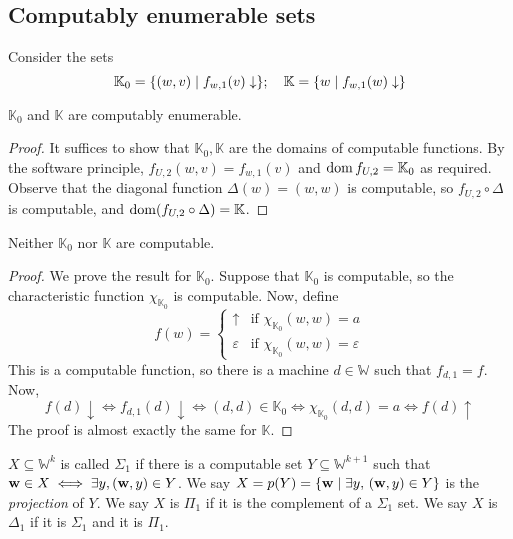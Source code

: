\subsection{Computably enumerable sets}
Consider the sets
\[ \mathbb K_0 = \qty{(w, v) \mid f_{w,1}(v) \downarrow};\quad \mathbb K = \qty{w \mid f_{w,1}(w) \downarrow} \]
\begin{theorem}
	\( \mathbb K_0 \) and \( \mathbb K \) are computably enumerable.
\end{theorem}
\begin{proof}
	It suffices to show that \( \mathbb K_0, \mathbb K \) are the domains of computable functions.
	By the software principle, \( f_{U,2}(w,v) = f_{w,1}(v) \) and \( \operatorname{dom} f_{U,2} = \mathbb K_0 \) as required.
	Observe that the diagonal function \( \Delta(w) = (w, w) \) is computable, so \( f_{U,2} \circ \Delta \) is computable, and \( \operatorname{dom}(f_{U,2} \circ \Delta) = \mathbb K \).
\end{proof}
\begin{theorem}
	Neither \( \mathbb K_0 \) nor \( \mathbb K \) are computable.
\end{theorem}
\begin{proof}
	We prove the result for \( \mathbb K_0 \).
	Suppose that \( \mathbb K_0 \) is computable, so the characteristic function \( \chi_{\mathbb K_0} \) is computable.
	Now, define
	\[ f(w) = \begin{cases}
		\uparrow & \text{if } \chi_{\mathbb K_0}(w,w) = a \\
		\varepsilon & \text{if } \chi_{\mathbb K_0}(w,w) = \varepsilon
	\end{cases} \]
	This is a computable function, so there is a machine \( d \in \mathbb W \) such that \( f_{d,1} = f \).
	Now,
	\[ f(d) \downarrow \iff f_{d,1}(d) \downarrow \iff (d,d) \in \mathbb K_0 \iff \chi_{\mathbb K_0}(d,d) = a \iff f(d) \uparrow \]
	The proof is almost exactly the same for \( \mathbb K \).
\end{proof}
\begin{definition}
	\( X \subseteq \mathbb W^k \) is called \( \Sigma_1 \) if there is a computable set \( Y \subseteq \mathbb W^{k+1} \) such that \( \vb w \in X \iff \exists y, (\vb w, y) \in Y \).
	We say \( X = p(Y) = \qty{\vb w \mid \exists y,\, (\vb w, y) \in Y} \) is the \emph{projection} of \( Y \).
	We say \( X \) is \( \Pi_1 \) if it is the complement of a \( \Sigma_1 \) set.
	We say \( X \) is \( \Delta_1 \) if it is \( \Sigma_1 \) and it is \( \Pi_1 \).
\end{definition}
